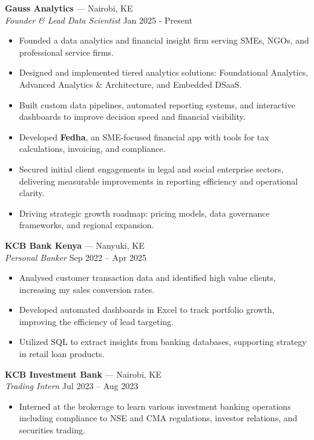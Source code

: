 \documentclass[11pt,a4paper]{article}
\begin{document}
\textbf{Gauss Analytics} — Nairobi, KE \\
\textit{Founder \& Lead Data Scientist} \hfill Jan 2025 - Present
\begin{itemize}[leftmargin=*]
    \item Founded a data analytics and financial insight firm serving SMEs, NGOs, and professional service firms.
    \item Designed and implemented tiered analytics solutions: Foundational Analytics, Advanced Analytics \& Architecture, and Embedded DSaaS.
    \item Built custom data pipelines, automated reporting systems, and interactive dashboards to improve decision speed and financial visibility.
    \item Developed \textbf{Fedha}, an SME-focused financial app with tools for tax calculations, invoicing, and compliance.
    \item Secured initial client engagements in legal and social enterprise sectors, delivering measurable improvements in reporting efficiency and operational clarity.
    \item Driving strategic growth roadmap: pricing models, data governance frameworks, and regional expansion.
\end{itemize}

\textbf{KCB Bank Kenya} — Nanyuki, KE \\
\textit{Personal Banker} \hfill Sep 2022 – Apr 2025
\begin{itemize}[leftmargin=*]
    \item Analysed customer transaction data and identified high value clients, increasing my sales conversion rates.
    \item Developed automated dashboards in Excel to track portfolio growth, improving the efficiency of lead targeting.
    \item Utilized SQL to extract insights from banking databases, supporting strategy in retail loan products.
\end{itemize}

\textbf{KCB Investment Bank} — Nairobi, KE \\
\textit{Trading Intern} \hfill Jul 2023 – Aug 2023
\begin{itemize}[leftmargin=*]
    \item Interned at the brokerage to learn various investment banking operations including compliance to NSE and CMA regulations, investor relations, and securities trading.
\end{itemize}
\end{document}
